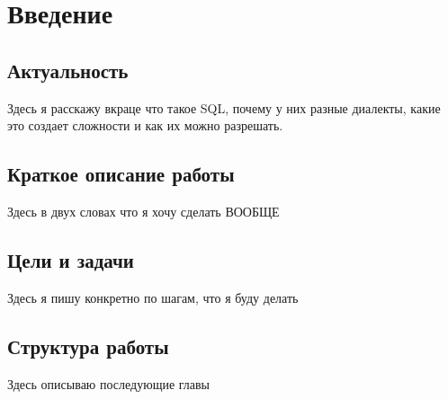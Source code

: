 \section{Введение}
\subsection{Актуальность}
Здесь я расскажу вкраце что такое SQL, почему у них разные диалекты, какие это создает сложности и как их можно разрешать.

\subsection{Краткое описание работы}
Здесь в двух словах что я хочу сделать ВООБЩЕ

\subsection{Цели и задачи}
Здесь я пишу конкретно по шагам, что я буду делать

\subsection{Структура работы}
Здесь описываю последующие главы
